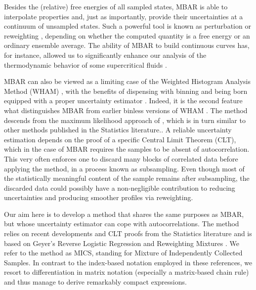 \documentclass[journal=jctcce,manuscript=article]{achemso}
\begin{document}
Besides the (relative) free energies of all sampled states, MBAR is able to interpolate properties and, just as importantly, provide their uncertainties at a continuum of unsampled states. Such a powerful tool is known as perturbation \cite{Zwanzig_1954} or reweighting \cite{McDonald_1967, McDonald_1969}, depending on whether the computed quantity is a free energy or an ordinary ensemble average. The ability of MBAR to build continuous curves has, for instance, allowed us to significantly enhance our analysis of the thermodynamic behavior of some supercritical fluids \cite{Aimoli_2014, Aimoli_2014_2, Nichele_2018}.

MBAR can also be viewed as a limiting case of the Weighted Histogram Analysis Method (WHAM) \cite{Kumar_1992}, with the benefits of dispensing with binning \cite{Tan_2012} and being born equipped with a proper uncertainty estimator \cite{Shirts_2008}. Indeed, it is the second feature what distinguishes MBAR from earlier binless versions of WHAM \cite{Bartels_2000, Souaille_2001}. The method descends from the maximum likelihood approach of \citeauthor{Kong_2003} \cite{Kong_2003}, which is in turn similar to other methods published in the Statistics literature.\cite{Vardi_1985, Gill_1988, Geyer_1994, Lindsay_1995, Meng_1996}. A reliable uncertainty estimation depends on the proof of a specific Central Limit Theorem (CLT), which in the case of MBAR requires the samples to be absent of autocorrelation. This very often enforces one to discard many blocks of correlated data before applying the method, in a process known as subsampling. Even though most of the statistically meaningful content of the sample remains after subsampling, the discarded data could possibly have a non-negligible contribution to reducing uncertainties and producing smoother profiles via reweighting.

Our aim here is to develop a method that shares the same purposes as MBAR, but whose uncertainty estimator can cope with autocorrelations. The method relies on recent developments and CLT proofs from the Statistics literature\cite{Flegal_2010, Buta_2010, Buta_2011, Doss_2014, Vats_2015, Tan_2015, Roy_2018} and is based on Geyer's Reverse Logistic Regression and Reweighting Mixtures \cite{Geyer_1994}. We refer to the method as MICS, standing for Mixture of Independently Collected Samples. In contrast to the index-based notation employed in these references, we resort to differentiation in matrix notation (especially a matrix-based chain rule) and thus manage to derive remarkably compact expressions.
\end{document}
